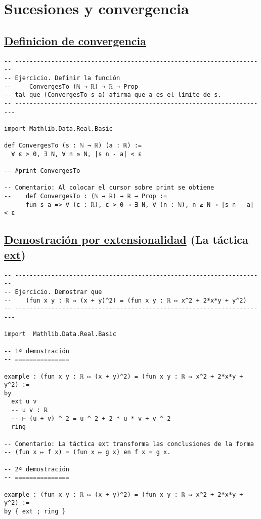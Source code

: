 \section{Sucesiones y convergencia}
\label{sec:org96fdbf6}

\subsection{\href{./src/Logica/Definicion\_de\_convergencia.lean}{Definicion de convergencia}}
\label{sec:orga579410}
\begin{verbatim}
-- ---------------------------------------------------------------------
-- Ejercicio. Definir la función
--     ConvergesTo (ℕ → ℝ) → ℝ → Prop
-- tal que (ConvergesTo s a) afirma que a es el límite de s.
-- ----------------------------------------------------------------------

import Mathlib.Data.Real.Basic

def ConvergesTo (s : ℕ → ℝ) (a : ℝ) :=
  ∀ ε > 0, ∃ N, ∀ n ≥ N, |s n - a| < ε

-- #print ConvergesTo

-- Comentario: Al colocar el cursor sobre print se obtiene
--    def ConvergesTo : (ℕ → ℝ) → ℝ → Prop :=
--    fun s a => ∀ (ε : ℝ), ε > 0 → ∃ N, ∀ (n : ℕ), n ≥ N → |s n - a| < ε
\end{verbatim}

\subsection{\href{./src/Logica/Demostracion\_por\_extensionalidad.lean}{Demostración por extensionalidad} (La táctica \href{https://bit.ly/3i5kiW9}{ext})}
\label{sec:orgb7b65db}
\begin{verbatim}
-- ---------------------------------------------------------------------
-- Ejercicio. Demostrar que
--    (fun x y : ℝ ↦ (x + y)^2) = (fun x y : ℝ ↦ x^2 + 2*x*y + y^2)
-- ----------------------------------------------------------------------

import  Mathlib.Data.Real.Basic

-- 1ª demostración
-- ===============

example : (fun x y : ℝ ↦ (x + y)^2) = (fun x y : ℝ ↦ x^2 + 2*x*y + y^2) :=
by
  ext u v
  -- u v : ℝ
  -- ⊢ (u + v) ^ 2 = u ^ 2 + 2 * u * v + v ^ 2
  ring

-- Comentario: La táctica ext transforma las conclusiones de la forma
-- (fun x ↦ f x) = (fun x ↦ g x) en f x = g x.

-- 2ª demostración
-- ===============

example : (fun x y : ℝ ↦ (x + y)^2) = (fun x y : ℝ ↦ x^2 + 2*x*y + y^2) :=
by { ext ; ring }
\end{verbatim}

